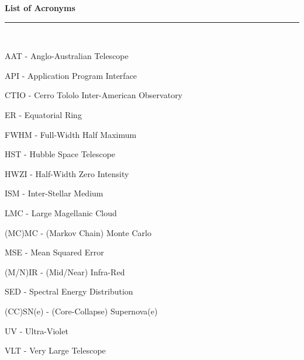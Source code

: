 \thispagestyle{empty}
\begin{raggedleft}
\vspace*{23mm}
\hfill {\huge {\bf {List of Acronyms}}} \\
\vspace{6mm}
\hfill \rule{4in}{.015in} \\
\vspace{19mm}
\end{raggedleft}




%
%

AAT - Anglo-Australian Telescope

API - Application Program Interface

CTIO - Cerro Tololo Inter-American Observatory

ER - Equatorial Ring

FWHM - Full-Width Half Maximum

HST - Hubble Space Telescope

HWZI - Half-Width Zero Intensity

ISM - Inter-Stellar Medium

LMC - Large Magellanic Cloud

(MC)MC - (Markov Chain) Monte Carlo

MSE - Mean Squared Error

(M/N)IR - (Mid/Near) Infra-Red 

SED - Spectral Energy Distribution

(CC)SN(e) - (Core-Collapse) Supernova(e)

UV - Ultra-Violet

VLT - Very Large Telescope
